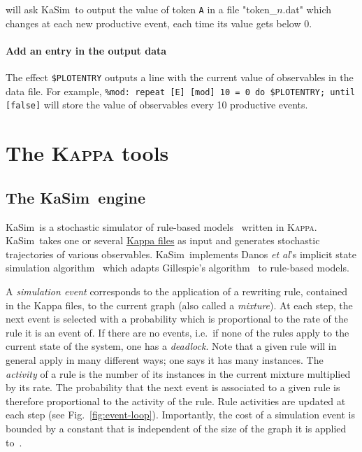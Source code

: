 \documentclass[11pt]{book}
\def\Kappa{\textsc{Kappa}}
\def\KaSim{\textsf{KaSim}}
\def\ttt#1{\texttt{#1}}
\def\ie{i.e.~}
\begin{document}
will ask \KaSim~to output the value of token \ttt{A} in a file
"token\_$n$.dat" which changes at each new productive event, each time
its value gets below 0.

\subsubsection{Add an entry in the output data}
The effect \ttt{\$PLOTENTRY} outputs a line with the current value of observables in the data file. For example,
\lstinline[language=kappa]!%mod: repeat [E] [mod] 10 = 0 do $PLOTENTRY; until [false]!
will store the value of observables every 10 productive events.

\chapter{The \Kappa{} tools}
\section{The \KaSim~engine}
\KaSim~is a stochastic simulator of rule-based
models~\cite{DanLan04,Dan_etal07a,Fae_etal05} written in
\Kappa. \KaSim~takes one or several \hyperref[chap:kappa]{Kappa files}
as input and generates stochastic trajectories of various
observables. \KaSim~implements Danos \textit{et al}'s implicit state
simulation algorithm~\cite{Dan_etal07b} which adapts Gillespie's
algorithm~\cite{Gil76,Gil77} to rule-based models.

A \emph{simulation event} corresponds to the application
of a rewriting rule, contained in the Kappa files, to the current
graph (also called a \emph{mixture}).
At each step, the next event is selected with a probability which is
proportional to the rate of the rule it is an event of.
If there are no events, {\ie}if none of the rules apply to the current
state of the system, one has a \emph{deadlock}. Note that a given rule
will in general apply in many different ways; one says it has many
instances. The \emph{activity} of a rule is the number
of its instances in the current mixture multiplied by
its rate. The probability that the next event is associated to a given
rule is therefore proportional to the activity of the rule.  Rule
activities are updated at each step (see
Fig.~\ref{fig:event-loop}). Importantly, the cost of a simulation
event is bounded by a constant that is independent of the size of the
graph it is applied to~\cite{Dan_etal07b}.
\end{document}
